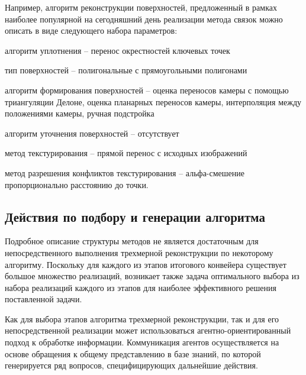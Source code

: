 Например, алгоритм реконструкции поверхностей, предложенный в рамках наиболее популярной на сегодняшний день реализации метода связок можно описать в виде следующего набора параметров:
\begin{textitemize}
    \item алгоритм уплотнения -- перенос окрестностей ключевых точек
    \item тип поверхностей -- полигональные с прямоугольными полигонами
    \item алгоритм формирования поверхностей -- оценка переносов камеры с помощью триангуляции Делоне, оценка планарных переносов камеры, интерполяция между положениями камеры, ручная подстройка
    \item алгоритм уточнения поверхностей -- отсутствует
    \item метод текстурирования -- прямой перенос с исходных изображений
    \item метод разрешения конфликтов текстурирования -- альфа-смешение пропорционально расстоянию до точки.
\end{textitemize}

\subsection{Действия по подбору и генерации алгоритма}

Подробное описание структуры методов не является достаточным для непосредственного выполнения трехмерной реконструкции по некоторому алгоритму. Поскольку для каждого из этапов итогового конвейера существует большое множество реализаций, возникает также задача оптимального выбора из набора реализаций каждого из этапов для наиболее эффективного решения поставленной задачи.

Как для выбора этапов алгоритма трехмерной реконструкции, так и для его непосредственной реализации может использоваться агентно-ориентированный подход к обработке информации. Коммуникация агентов осуществляется на основе обращения к общему представлению в базе знаний, по которой генерируется ряд вопросов, специфицирующих дальнейшие действия.

